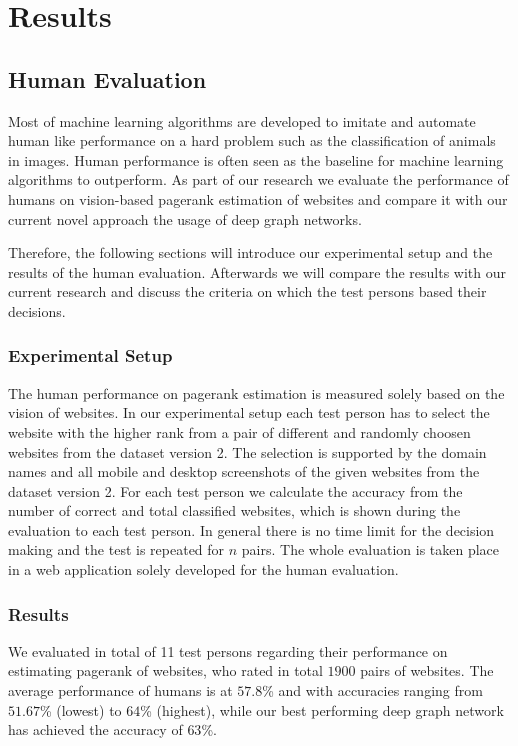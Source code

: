 \section{Results}

\subsection{Human Evaluation}
Most of machine learning algorithms are developed to imitate and automate human like performance on a hard problem such as the classification of animals in images. Human performance is often seen as the baseline for machine learning algorithms to outperform. As part of our research we evaluate the performance of humans on vision-based pagerank estimation of websites and compare it with our current novel approach the usage of deep graph networks. 

Therefore, the following sections will introduce our experimental setup and the results of the human evaluation. Afterwards we will compare the results with our current research and discuss the criteria on which the test persons based their decisions.

\subsubsection{Experimental Setup} 
The human performance on pagerank estimation is measured solely based on the vision of websites. In our experimental setup each test person has to select the website with the higher rank from a pair of different and randomly choosen websites from the dataset version 2. The selection is supported by the domain names and all mobile and desktop screenshots of the given websites from the dataset version 2. For each test person we calculate the accuracy from the number of correct and total classified websites, which is shown during the evaluation to each test person. In general there is no time limit for the decision making and the test is repeated for $n$ pairs. The whole evaluation is taken place in a web application solely developed for the human evaluation.

\subsubsection{Results}
We evaluated in total of 11 test persons regarding their performance on estimating pagerank of websites, who rated in total $1900$ pairs of websites. The average performance of humans is at $57.8$\% and with accuracies ranging from $51.67$\% (lowest) to $64$\% (highest), while our best performing deep graph network has achieved the accuracy of $63$\%.

